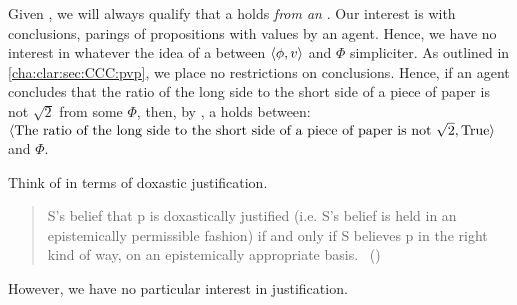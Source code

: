 \begin{note}
  Given \supportI{}, we will always qualify that a \ros{} holds \emph{from an \agpe{}}.
  Our interest is with conclusions, parings of propositions with values by an agent.
  Hence, we have no interest in whatever the idea of a \ros{} between \(\langle \phi, v \rangle\) and \(\Phi\) simpliciter.
  As outlined in \autoref{cha:clar:sec:CCC:pvp}, we place no restrictions on conclusions.
  Hence, if an agent concludes that the ratio of the long side to the short side of a piece of paper is not \(\sqrt{2}\) from some \poP{} \(\Phi\), then, by \supportI{}, a \ros{} holds between:
  \(\langle \text{The ratio of the long side to the short side of a piece of paper is not }\sqrt{2}, \text{True} \rangle\) and \(\Phi\).
\end{note}

\begin{note}
  Think of \supportI{} in terms of doxastic justification.

  \begin{quote}
    S’s belief that p is doxastically justified (i.e. S’s belief is held in an epistemically permissible fashion) if and only if S believes p in the right kind of way, on an epistemically appropriate basis.%
    \mbox{ }\hfill\mbox{(\citeyear{Bondy:2018tk})}
  \end{quote}

  However, we have no particular interest in justification.
\end{note}


